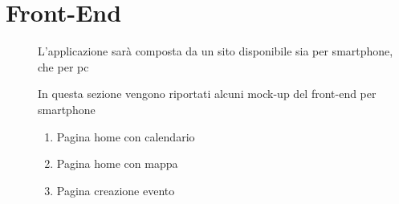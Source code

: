 \documentclass{article}
\begin{document}
\section{Front-End}
\begin{description}
    \item[] L'applicazione sarà composta da un sito disponibile sia per smartphone, che per pc
    \item[] In questa sezione vengono riportati alcuni mock-up del front-end per smartphone
        \begin{enumerate}
            \item Pagina home con calendario
            \item Pagina home con mappa
            \item Pagina creazione evento
        \end{enumerate}
\end{description}
\end{document}
